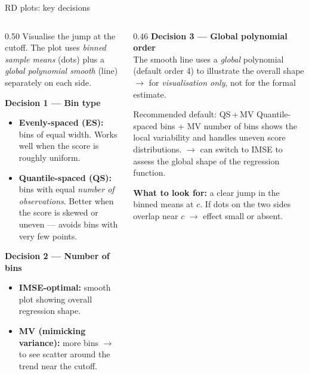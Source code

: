 \documentclass[aspectratio=169, 10pt]{beamer}
\begin{document}
\begin{frame}[shrink=5]{RD plots: key decisions \citep{cattaneo2019}}

  \begin{columns}[T]
    \begin{column}{0.50\textwidth}
      \small Visualise the jump at the cutoff. The plot uses
      \emph{binned sample means} (dots) plus a \emph{global polynomial
      smooth} (line) separately on each side.

      \medskip
      \textbf{Decision 1 — Bin type}
      \begin{itemize}\small
        \item \textbf{Evenly-spaced (ES):} bins of equal width.
              Works well when the score is roughly uniform.
        \item \textbf{Quantile-spaced (QS):} bins with equal
              \emph{number of observations}. Better when the score
              is skewed or uneven — avoids bins with very few points.
      \end{itemize}

      \smallskip
      \textbf{Decision 2 — Number of bins}
      \begin{itemize}\small
        \item \textbf{IMSE-optimal:} smooth plot showing overall regression shape. 
        \item \textbf{MV (mimicking variance):} more bins $\rightarrow$ to see scatter around the trend near the cutoff.
      \end{itemize}
    \end{column}
    \begin{column}{0.46\textwidth}
      \textbf{Decision 3 — Global polynomial order}\\[3pt]
      \small The smooth line uses a \emph{global} polynomial (default
      order 4) to illustrate the overall shape $\rightarrow$ for
      \emph{visualisation only}, not for the formal estimate.

      \smallskip
      \begin{block}{Recommended default: QS\,+\,MV}\small
        Quantile-spaced bins + MV number of bins shows the local
        variability and handles uneven score distributions. $\rightarrow$ can switch to IMSE to assess
        the global shape of the regression function.
      \end{block}

      \smallskip\small
      \textbf{What to look for:} a clear jump in the binned means at
      $c$. If dots on the two sides overlap near $c$ $\rightarrow$ effect small or absent.
    \end{column}
  \end{columns}

\end{frame}
\end{document}
